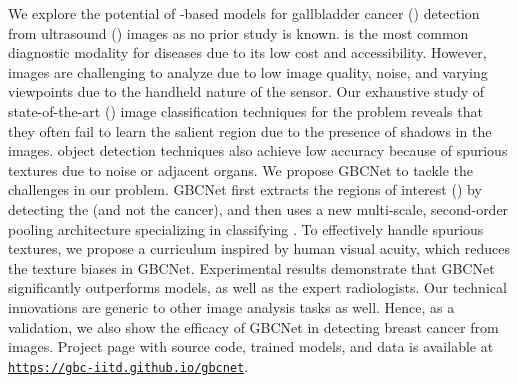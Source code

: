 
We explore the potential of \cnn-based models for gallbladder cancer (\gbc) detection from ultrasound (\usg) images as no prior study is known. \usg is the most common diagnostic modality for \gb diseases due to its low cost and accessibility. However, \usg images are challenging to analyze due to low image quality, noise, and varying viewpoints due to the handheld nature of the sensor. Our exhaustive study of state-of-the-art (\sota) image classification techniques for the problem reveals that they often fail to learn the salient \gb region due to the presence of shadows in the \usg images. \sota object detection techniques also achieve low accuracy because of spurious textures due to noise or adjacent organs. We propose GBCNet to tackle the challenges in our problem. GBCNet first extracts the regions of interest (\rois) by detecting the \gb (and not the cancer), and then uses a new multi-scale, second-order pooling architecture specializing in classifying \gbc. To effectively handle spurious textures, we propose a curriculum inspired by human visual acuity, which reduces the texture biases in GBCNet. Experimental results demonstrate that GBCNet significantly outperforms \sota \cnn models, as well as the expert radiologists. Our technical innovations are generic to other \usg image analysis tasks as well. Hence, as a validation, we also show the efficacy of GBCNet in detecting  breast cancer from \usg images. Project page with source code, trained models, and data is available at \href{https://gbc-iitd.github.io/gbcnet.html}{\texttt{https://gbc-iitd.github.io/gbcnet}}. %

